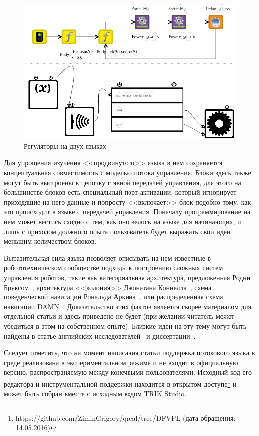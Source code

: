 \documentclass[a5paper]{article}
\begin{document}
\begin{figure}[ht]
    \centering
    \includegraphics[width=4.5in]{TS_AlongTheBox_Comparison.png}
    \caption{Регуляторы на двух языках}
    \label{image:alongTheBox_CF_DF}
\end{figure}

Для упрощения изучения <<продвинутого>> языка в нем сохраняется концептуальная совместимость с моделью потока управления. Блоки здесь также могут быть выстроены в цепочку с явной передачей управления, для этого на большинстве блоков есть специальный порт активации, который игнорирует приходящие на него данные и попросту <<включает>> блок подобно тому, как это происходит в языке с передачей управления. Поначалу программирование на нем может вестись сходно с тем, как оно велось на языке для начинающих, и лишь с приходом должного опыта пользователь будет выражать свои идеи меньшим количеством блоков. 

Выразительная сила языка позволяет описывать на нем известные в робототехническом сообществе подходы к построению сложных систем управления роботов, такие как категориальная архитектура, предложенная Родни Бруксом~\cite{brooks1986robust}, архитектура <<колония>> Джонатана Коннелла~\cite{connell1989colony}, схема поведенческой навигации Рональда Аркина~\cite{arkin1987motor}, или распределенная схема навигации DAMN~\cite{rosenblatt1997damn}. Доказательство этих фактов является скорее материалом для отдельной статьи и здесь приведено не будет (при желании читатель может убедиться в этом на собственном опыте). Близкие идеи на эту тему могут быть найдены в статье английских исследователей~\cite{simpson2009toward} и диссертации~\cite{banyasad2000visual}.

Следует отметить, что на момент написания статьи поддержка потокового языка в среде реализована в экспериментальном режиме и не входит в официальную версию, распространяемую между конечными пользователями. Исходный код его редактора и инструментальной поддержки находится в открытом доступе\footnote{https://github.com/ZiminGrigory/qreal/tree/DFVPL (дата обращения: 14.05.2016)} и может быть собран вместе с исходным кодом TRIK Studio.
\end{document}

